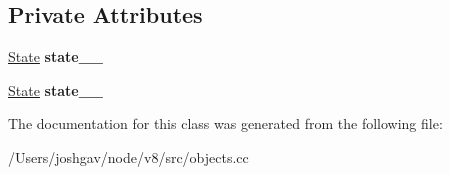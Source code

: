 \subsection*{Private Attributes}
\begin{DoxyCompactItemize}
\item 
\hyperlink{classv8_1_1internal_1_1_string_comparator_1_1_state}{State} {\bfseries state\+\_\+\_\+}\hypertarget{classv8_1_1internal_1_1_string_comparator_a16d549e2e9f32d70ef8115f65df33e68}{}\label{classv8_1_1internal_1_1_string_comparator_a16d549e2e9f32d70ef8115f65df33e68}

\item 
\hyperlink{classv8_1_1internal_1_1_string_comparator_1_1_state}{State} {\bfseries state\+\_\+\_\+}\hypertarget{classv8_1_1internal_1_1_string_comparator_a5fb00e19c4f2b203601978de2fa01d2d}{}\label{classv8_1_1internal_1_1_string_comparator_a5fb00e19c4f2b203601978de2fa01d2d}

\end{DoxyCompactItemize}


The documentation for this class was generated from the following file\+:\begin{DoxyCompactItemize}
\item 
/\+Users/joshgav/node/v8/src/objects.\+cc\end{DoxyCompactItemize}
